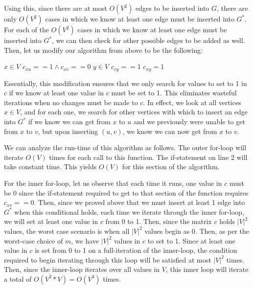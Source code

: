 \documentclass[11pt]{article}
\begin{document}
Using this, since there are at most $O(V^2)$ edges to be inserted into $G$, there are only $O(V^2)$ cases in which we know at least one edge must be inserted into $G^*$. For each of the $O(V^2)$ cases in which we know at least one edge must be inserted into $G^*$, we can then check for other possible edges to be added as well. Then, let us modify our algorithm from above to be the following:

\begin{codebox}
\li \For $x \in V$ \Do
\li     \If $c_{xu} == 1 \land c_{xv} == 0$ \Do
\li         \For $y \in V$ \Do
\li             \If $c_{vy} == 1$ \Do
\li                 $c_{xy} = 1$
                \End
            \End
        \End
    \End
\end{codebox}

Essentially, this modification ensures that we only search for values to set to 1 in $c$ if we know at least one value in $c$ must be set to 1. This eliminates wasteful iterations when no changes must be made to $c$. In effect, we look at all vertices $x \in V$, and for each one, we search for other vertices with which to insert an edge into $G^*$ if we know we can get from $x$ to $u$ and we previously were unable to get from $x$ to $v$, but upon inserting $(u,v)$, we know we can now get from $x$ to $v$.

We can analyze the run-time of this algorithm as follows. The outer for-loop will iterate $O(V)$ times for each call to this function. The if-statement on line 2 will take constant time. This yields $O(V)$ for this section of the algorithm.

For the inner for-loop, let us observe that each time it runs, one value in $c$ must be 0 since the if-statement required to get to that section of the function requires $c_{xv} == 0$. Then, since we proved above that we must insert at least 1 edge into $G^*$ when this conditional holds, each time we iterate through the inner for-loop, we will set at least one value in $c$ from 0 to 1. Then, since the matrix $c$ holds $|V|^2$ values, the worst case scenario is when all $|V|^2$ values begin as 0. Then, as per the worst-case choice of $m$, we have $|V|^2$ values in $c$ to set to 1. Since at least one value in $c$ is set from 0 to 1 on a full-iteration of the inner-loop, the condition required to begin iterating through this loop will be satisfied at most $|V|^2$ times. Then, since the inner-loop iterates over all values in $V$, this inner loop will iterate a total of $O(V^2 * V) = O(V^3)$ times.
\end{document}
